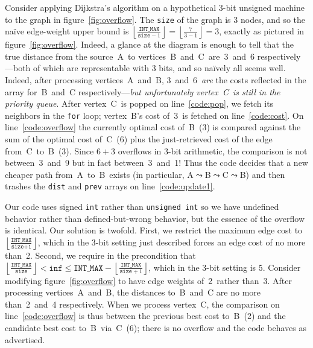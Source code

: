 Consider applying Dijkstra's algorithm on a hypothetical 3-bit unsigned machine to 
the graph in figure~\ref{fig:overflow}.  The \texttt{size} of the graph is 3 nodes, and so the na\"ive edge-weight upper bound is $\left\lfloor\frac{\texttt{INT\_MAX}}{\texttt{size}-1}\right\rfloor = \left\lfloor\frac{7}{3-1}\right\rfloor = 3$, exactly as pictured in figure~\ref{fig:overflow}.  Indeed, a glance at the diagram is enough to tell that the true distance from the source~A~to vertices~B~and~C~are~3~and~6 respectively---both of which are representable with 3 bits, and so na\"ively all seems well.  %
Indeed, after processing vertices~A~and~B, 3~and~6~\emph{are} the costs reflected in the  array for~B~and~C respectively---\emph{but unfortunately vertex~C~is still in the priority queue}.  After vertex~C~is popped on line~\ref{code:pop}, we fetch its neighbors in the \texttt{for} loop; vertex~B's cost of~3~is fetched on line~\ref{code:cost}.  On line~\ref{code:overflow} the currently optimal cost of~B~(3) is compared against the sum of the optimal cost of~C~(6) plus the just-retrieved cost of the edge from~C~to~B~(3).  Since $6+3$ overflows in 3-bit arithmetic, the comparison is not between~3~and~9 but in fact between~3~and~1!  Thus the code decides that a new cheaper path from~A~to~B~exists (in particular, A$\leadsto$B$\leadsto$C$\leadsto$B) and then trashes the \texttt{dist} and \texttt{prev} arrays on line~\ref{code:update1}.  %

Our code uses signed \texttt{int} rather than \texttt{unsigned int} so we have undefined behavior rather than defined-but-wrong behavior, but the essence of the overflow is identical.
Our solution is twofold.  First, we restrict the maximum edge cost to $\left\lfloor\frac{\texttt{INT\_MAX}}{\texttt{size+1}}\right\rfloor$, which in the 3-bit setting just described forces an edge cost of no more than~2.  Second, we require in the precondition that 
$\left\lfloor \frac{\texttt{INT\_MAX}}{\texttt{size}} \right\rfloor < \texttt{inf} \le \texttt{INT\_MAX} - \left\lfloor \frac{\texttt{INT\_MAX}}{\texttt{size}+1} \right\rfloor$, which in the 3-bit setting is 5.  Consider modifying figure~\ref{fig:overflow} to
have edge weights of~2~rather than~3.  After processing vertices~A~and~B, the distances to~B~and~C are no more than~2~and~4 respectively.  When we process vertex~C, the comparison on line~\ref{code:overflow} is thus between the previous best cost to~B~(2) and the candidate best cost to~B~via~C~(6); there is no overflow and the code behaves as advertised.


